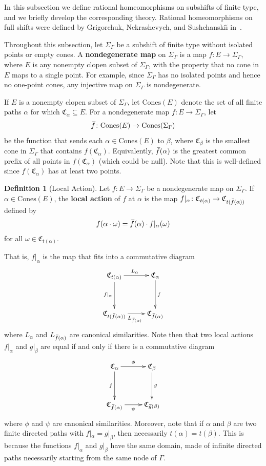 \documentclass[11pt,letterpaper]{amsart}
\theoremstyle{definition}
\newtheorem{definition}[theorem]{Definition}
\newcommand{\newword}[1]{\textbf{#1}}
\newcommand{\C}{\mathfrak{C}}
\newcommand{\Cones}{\mathrm{Cones}}
\newcommand{\of}{\mkern 3.5mu\overline{\mkern-3.5mu f\mkern0.75mu}\mkern-0.75mu}
\newcommand{\og}{\mkern 2mu\overline{\mkern-2mu g\mkern0.5mu}\mkern-0.5mu}
\begin{document}
In this subsection we define rational homeomorphisms on subshifts of finite type, and we briefly develop the corresponding theory.  Rational homeomorphisms on full shifts were defined by Grigorchuk, Nekrashevych, and Sushchanski\u{\i} in~\cite{GNS}.

Throughout this subsection, let $\Sigma_\Gamma$ be a subshift of finite type without isolated points or empty cones. 
A \newword{nondegenerate map} on $\Sigma_\Gamma$ is a map $f\colon E\to \Sigma_\Gamma$, where $E$ is any nonempty clopen subset of $\Sigma_\Gamma$, with the property that no cone in $E$ maps to a single point.  For example, since $\Sigma_\Gamma$ has no isolated points and hence no one-point cones, any injective map on $\Sigma_\Gamma$ is nondegenerate.

If $E$ is a nonempty clopen subset of $\Sigma_\Gamma$, let $\Cones(E)$ denote the set of all finite paths $\alpha$ for which $\C_\alpha\subseteq E$. For a nondegenerate map $f\colon E\to \Sigma_\Gamma$, let
\[
\of\colon \Cones(E) \to \Cones(\Sigma_\Gamma)
\]
be the function that sends each $\alpha\in \mathrm{Cones}(E)$ to $\beta$, where $\C_\beta$ is the smallest cone in $\Sigma_\Gamma$ that contains $f(\C_\alpha)$.  Equivalently, $\of(\alpha)$ is the greatest common prefix of all points in $f(\C_\alpha)$ (which could be null). Note that this is well-defined since $f(\C_\alpha)$ has at least two points.

\begin{definition}[Local Action]
Let $f\colon E\to \Sigma_\Gamma$ be a nondegenerate map on $\Sigma_\Gamma$. If $\alpha\in \Cones(E)$, the \newword{local action} of $f$ at $\alpha$ is the map $f|_\alpha \colon \C_{t(\alpha)} \to \C_{t(\of(\alpha))}$ defined by
\[
f(\alpha\cdot \omega) = \of(\alpha)\cdot f|_{\alpha}(\omega)
\]
for all $\omega\in \C_{t(\alpha)}$.
\end{definition}

That is, $f|_\alpha$ is the map that fits into a commutative diagram
\[
\xymatrix@R=0.5in{
\C_{t(\alpha)} \ar_{f|_\alpha}[d] \ar^{L_\alpha}[r] & 
\C_{\alpha} \ar^{f}[d] \\ 
\C_{t(\of(\alpha))}\ar_{L_{\of(\alpha)}}[r] & \C_{\of(\alpha)}
}
\]
where $L_\alpha$ and $L_{\of(\alpha)}$ are canonical similarities.  Note then that two local actions $f|_\alpha$ and $g|_\beta$ are equal if and only if there is a commutative diagram
\[
\xymatrix@R=0.5in{
\C_{\alpha} \ar_{f}[d] \ar^{\phi}[r] & 
\C_{\beta} \ar^{g}[d] \\ 
\C_{\of(\alpha)}\ar_{\psi}[r] & \C_{\og(\beta)}
}
\]
where $\phi$ and $\psi$ are canonical similarities.
Moreover, note that if
$\alpha$ and $\beta$ are two finite directed paths with $f|_{\alpha}=g|_{\beta}$, then necessarily $t(\alpha)=t(\beta)$. This is because the functions $f|_{\alpha}$ and $g|_{\beta}$ have the same domain, made of infinite directed paths necessarily starting from the same node of $\Gamma$.
\end{document}
